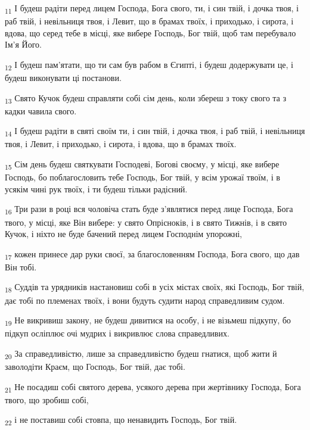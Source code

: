 \begin{tcolorbox}
\textsubscript{11} І будеш радіти перед лицем Господа, Бога свого, ти, і син твій, і дочка твоя, і раб твій, і невільниця твоя, і Левит, що в брамах твоїх, і приходько, і сирота, і вдова, що серед тебе в місці, яке вибере Господь, Бог твій, щоб там перебувало Ім'я Його.
\end{tcolorbox}
\begin{tcolorbox}
\textsubscript{12} І будеш пам'ятати, що ти сам був рабом в Єгипті, і будеш додержувати це, і будеш виконувати ці постанови.
\end{tcolorbox}
\begin{tcolorbox}
\textsubscript{13} Свято Кучок будеш справляти собі сім день, коли збереш з току свого та з кадки чавила свого.
\end{tcolorbox}
\begin{tcolorbox}
\textsubscript{14} І будеш радіти в святі своїм ти, і син твій, і дочка твоя, і раб твій, і невільниця твоя, і Левит, і приходько, і сирота, і вдова, що в брамах твоїх.
\end{tcolorbox}
\begin{tcolorbox}
\textsubscript{15} Сім день будеш святкувати Господеві, Богові своєму, у місці, яке вибере Господь, бо поблагословить тебе Господь, Бог твій, у всім урожаї твоїм, і в усякім чині рук твоїх, і ти будеш тільки радісний.
\end{tcolorbox}
\begin{tcolorbox}
\textsubscript{16} Три рази в році вся чоловіча стать буде з'являтися перед лице Господа, Бога твого, у місці, яке Він вибере: у свято Опрісноків, і в свято Тижнів, і в свято Кучок, і ніхто не буде бачений перед лицем Господнім упорожні,
\end{tcolorbox}
\begin{tcolorbox}
\textsubscript{17} кожен принесе дар руки своєї, за благословенням Господа, Бога свого, що дав Він тобі.
\end{tcolorbox}
\begin{tcolorbox}
\textsubscript{18} Суддів та урядників настановиш собі в усіх містах своїх, які Господь, Бог твій, дає тобі по племенах твоїх, і вони будуть судити народ справедливим судом.
\end{tcolorbox}
\begin{tcolorbox}
\textsubscript{19} Не викривиш закону, не будеш дивитися на особу, і не візьмеш підкупу, бо підкуп осліплює очі мудрих і викривлює слова справедливих.
\end{tcolorbox}
\begin{tcolorbox}
\textsubscript{20} За справедливістю, лише за справедливістю будеш гнатися, щоб жити й заволодіти Краєм, що Господь, Бог твій, дає тобі.
\end{tcolorbox}
\begin{tcolorbox}
\textsubscript{21} Не посадиш собі святого дерева, усякого дерева при жертівнику Господа, Бога твого, що зробиш собі,
\end{tcolorbox}
\begin{tcolorbox}
\textsubscript{22} і не поставиш собі стовпа, що ненавидить Господь, Бог твій.
\end{tcolorbox}
